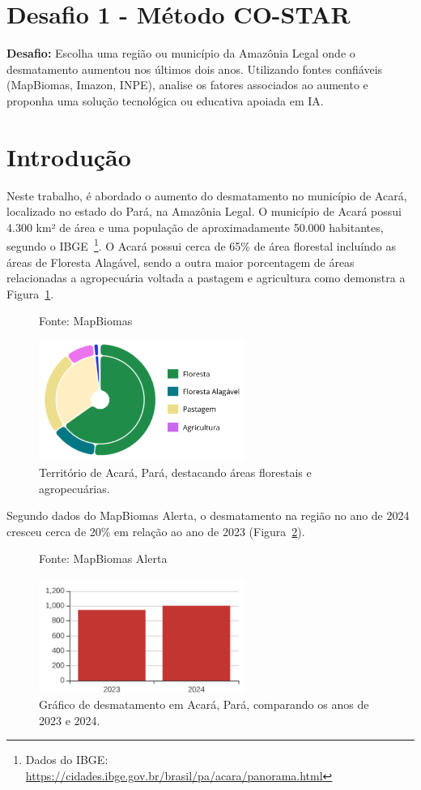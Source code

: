 \documentclass[12pt, a4paper, onecolumn, notitlepage]{article}
\begin{document}
    \section*{Desafio 1 - Método CO-STAR}
    \textbf{Desafio:} Escolha uma região ou município da Amazônia Legal onde o desmatamento aumentou nos últimos dois anos. Utilizando fontes confiáveis (MapBiomas, Imazon, INPE), analise os fatores associados ao aumento e proponha uma solução tecnológica ou educativa apoiada em IA.

    \section[short]{Introdução}
    Neste trabalho, é abordado o aumento do desmatamento no município de Acará, localizado no estado do Pará, na Amazônia Legal. O município de Acará possui 4.300 km² de área e uma população de aproximadamente 50.000 habitantes, segundo o IBGE~\footnote{Dados do IBGE: \url{https://cidades.ibge.gov.br/brasil/pa/acara/panorama.html}}. O Acará possui cerca de 65\% de área florestal incluíndo as áreas de Floresta Alagável, sendo a outra maior porcentagem de áreas relacionadas a agropecuária voltada a pastagem e agricultura como demonstra a Figura~\ref{fig:territorio_acara}.

    \begin{figure}[htbp]
        \centering
        \caption*{Fonte: MapBiomas}
        \includegraphics[width=0.6\textwidth]{figures/territorio_acara.png}
        \caption{Território de Acará, Pará, destacando áreas florestais e agropecuárias.}
        \label{fig:territorio_acara}
    \end{figure}
    
    Segundo dados do MapBiomas Alerta, o desmatamento na região no ano de 2024 cresceu cerca de 20\% em relação ao ano de 2023 (Figura~\ref{fig:grafico_desmatamento_2023_2024}).

    \begin{figure}[htbp]
        \centering
        \caption*{Fonte: MapBiomas Alerta}
        \includegraphics[width=0.6\textwidth]{figures/grafico_desmatamento_2023_2024.png}
        \caption{Gráfico de desmatamento em Acará, Pará, comparando os anos de 2023 e 2024.}
        \label{fig:grafico_desmatamento_2023_2024}
    \end{figure}
\end{document}
